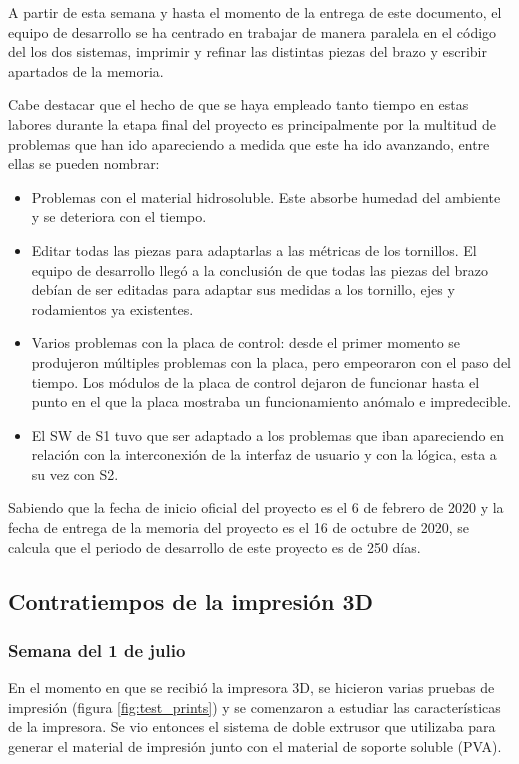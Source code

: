A partir de esta semana y hasta el momento de la entrega de este documento, el equipo de desarrollo se ha centrado en trabajar de manera paralela en el código del los dos sistemas, imprimir y refinar las distintas piezas del brazo y escribir apartados de la memoria.

Cabe destacar que el hecho de que se haya empleado tanto tiempo en estas labores durante la etapa final del proyecto es principalmente por la multitud de problemas que han ido apareciendo a medida que este ha ido avanzando, entre ellas se pueden nombrar:

\begin{itemize}
    \item Problemas con el material hidrosoluble. Este absorbe humedad del ambiente y se deteriora con el tiempo.
    \item Editar todas las piezas para adaptarlas a las métricas de los tornillos. El equipo de desarrollo llegó a la conclusión de que todas las piezas del brazo debían de ser editadas para adaptar sus medidas a los tornillo, ejes y rodamientos ya existentes.
    \item Varios problemas con la placa de control: desde el primer momento se produjeron múltiples problemas con la placa, pero empeoraron con el paso del tiempo. Los módulos de la placa de control dejaron de funcionar hasta el punto en el que la placa mostraba un funcionamiento anómalo e impredecible.
    \item El \ac{SW} de \ac{S1} tuvo que ser adaptado a
    los problemas que iban apareciendo en relación con la interconexión de la interfaz de usuario y con la lógica, esta a su vez con \ac{S2}.
\end{itemize}

Sabiendo que la fecha de inicio oficial del proyecto es el 6 de febrero de 2020 y la fecha de entrega de la memoria del proyecto es el 16 de octubre de 2020, se calcula que el periodo de desarrollo de este proyecto es de 250 días.

\subsection{Contratiempos de la impresión 3D}
\subsubsection*{Semana del 1 de julio}
En el momento en que se recibió la impresora 3D, se hicieron varias pruebas de
impresión (figura \ref{fig:test_prints}) y se comenzaron a estudiar las características
de la impresora. Se vio entonces el sistema de doble extrusor que utilizaba para
generar el material de impresión junto con el material de soporte soluble (\ac{PVA}).

